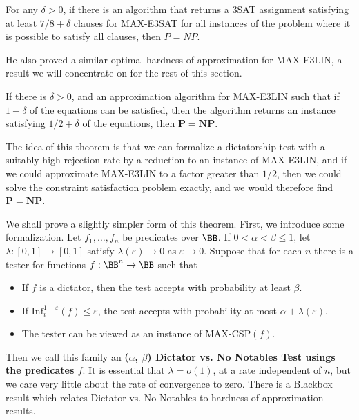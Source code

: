 \begin{theorem}[Hastad]
    For any $\delta > 0$, if there is an algorithm that returns a 3SAT assignment satisfying at least $7/8 + \delta$ clauses for MAX-E3SAT for all instances of the problem where it is possible to satisfy all clauses, then $P = NP$.
\end{theorem}

He also proved a similar optimal hardness of approximation for MAX-E3LIN, a result we will concentrate on for the rest of this section.

\begin{theorem}[Hastad]
    If there is $\delta > 0$, and an approximation algorithm for MAX-E3LIN such that if $1 - \delta$ of the equations can be satisfied, then the algorithm returns an instance satisfying $1/2 + \delta$ of the equations, then $\mathbf{P} = \mathbf{NP}$.
\end{theorem}

The idea of this theorem is that we can formalize a dictatorship test with a suitably high rejection rate by a reduction to an instance of MAX-E3LIN, and if we could approximate MAX-E3LIN to a factor greater than $1/2$, then we could solve the constraint satisfaction problem exactly, and we would therefore find $\mathbf{P} = \mathbf{NP}$.

We shall prove a slightly simpler form of this theorem. First, we introduce some formalization. Let $f_1, \dots, f_n$ be predicates over $\BB$. If $0 < \alpha < \beta \leq 1$, let $\lambda: [0,1] \to [0,1]$ satisfy $\lambda(\varepsilon) \to 0$ as $\varepsilon \to 0$. Suppose that for each $n$ there is a tester for functions $f: \BB^n \to \BB$ such that
%
\begin{itemize}
    \item If $f$ is a dictator, then the test accepts with probability at least $\beta$.
    \item If $\text{Inf}_i^{1 - \varepsilon}(f) \leq \varepsilon$, the test accepts with probability at most $\alpha + \lambda(\varepsilon)$.
    \item The tester can be viewed as an instance of MAX-CSP$(f)$.
\end{itemize}
%
Then we call this family an {\bf ($\alpha$, $\beta$) Dictator vs. No Notables Test usings the predicates $f$}. It is essential that $\lambda = o(1)$, at a rate independent of $n$, but we care very little about the rate of convergence to zero. There is a Blackbox result which relates Dictator vs. No Notables to hardness of approximation results.

